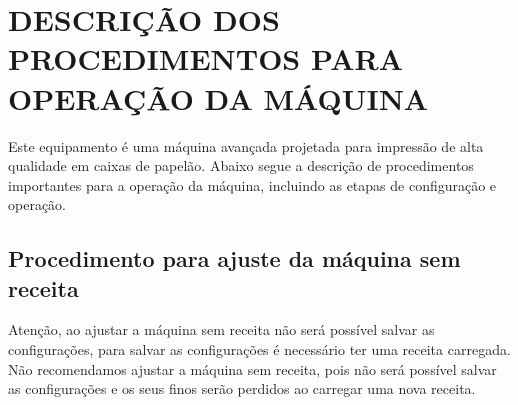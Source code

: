 \thispagestyle{fancy}

\vspace*{40 pt}

\section{\large{DESCRIÇÃO DOS PROCEDIMENTOS PARA OPERAÇÃO DA MÁQUINA}}

Este equipamento é uma máquina avançada projetada para impressão de alta qualidade em caixas de papelão.
Abaixo segue a descrição de procedimentos importantes para a operação da máquina, incluindo as etapas de configuração e operação.

\subsection{Procedimento para ajuste da máquina sem receita}

Atenção, ao ajustar a máquina sem receita não será possível salvar as configurações, para salvar as configurações é necessário ter uma receita carregada.
Não recomendamos ajustar a máquina sem receita, pois não será possível salvar as configurações e os seus finos serão perdidos ao carregar uma nova receita.


